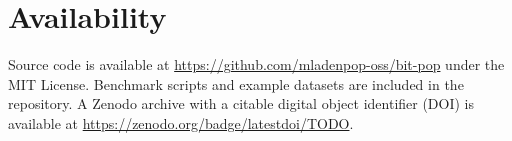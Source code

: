 \documentclass[utf8]{article}
\begin{document}
\section*{Availability}

Source code is available at \url{https://github.com/mladenpop-oss/bit-pop} under the MIT License. Benchmark scripts and example datasets are included in the repository. A Zenodo archive with a citable digital object identifier (DOI) is available at \url{https://zenodo.org/badge/latestdoi/TODO}.



\end{document}
